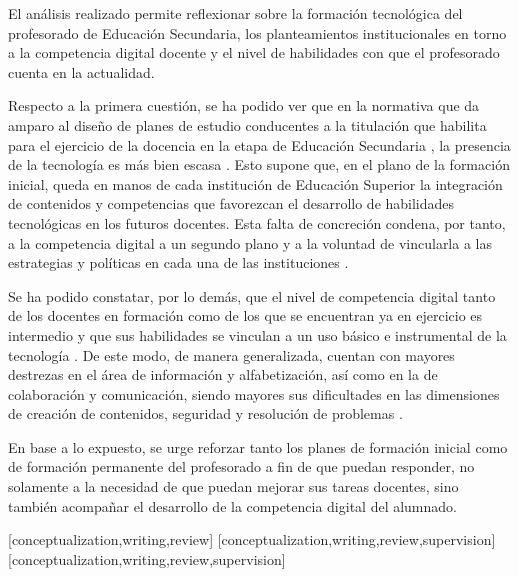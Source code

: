 \documentclass[spanish]{textolivre}
\begin{document}
El análisis realizado permite reflexionar sobre la formación tecnológica del profesorado de Educación Secundaria, los planteamientos institucionales en torno a la competencia digital docente y el nivel de habilidades con que el profesorado cuenta en la actualidad.

Respecto a la primera cuestión, se ha podido ver que en la normativa que da amparo al diseño de planes de estudio conducentes a la titulación que habilita para el ejercicio de la docencia en la etapa de Educación Secundaria \cite{ordeneci2007}, la presencia de la tecnología es más bien escasa \cite{pinto-santos_development_2022}. Esto supone que, en el plano de la formación inicial, queda en manos de cada institución de Educación Superior la integración de contenidos y competencias que favorezcan el desarrollo de habilidades tecnológicas en los futuros docentes. Esta falta de concreción condena, por tanto, a la competencia digital a un segundo plano y a la voluntad de vincularla a las estrategias y políticas en cada una de las instituciones \cite{sanchez-caballe_integrating_2021}.

Se ha podido constatar, por lo demás, que el nivel de competencia digital tanto de los docentes en formación como de los que se encuentran ya en ejercicio es intermedio y que sus habilidades se vinculan a un uso básico e instrumental de la tecnología \cite{garzon_artacho_competencia_2021, marin_suelves_alisis_2022}. De este modo, de manera generalizada, cuentan con mayores destrezas en el área de información y alfabetización, así como en la de colaboración y comunicación, siendo mayores sus dificultades en las dimensiones de creación de contenidos, seguridad y resolución de problemas \cite{mas2022competencia}.

En base a lo expuesto, se urge reforzar tanto los planes de formación inicial como de formación permanente del profesorado \cite{rodriguez-muniz_secondary_2021} a fin de que puedan responder, no solamente a la necesidad de que puedan mejorar sus tareas docentes, sino también acompañar el desarrollo de la competencia digital del alumnado.





\printbibliography\label{sec-bib}


\begin{contributors}
[conceptualization,writing,review]
[conceptualization,writing,review,supervision]
[conceptualization,writing,review,supervision]
\end{contributors}
\end{document}
